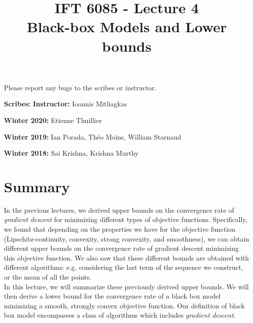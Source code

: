 \documentclass{article}
\title{IFT 6085 - Lecture 4 \\ 
Black-box Models and Lower bounds }
\date{}
\begin{document}
 

\maketitle

\vspace{-0.5in}
\begin{center}
Please report any bugs to the scribes or instructor.
\end{center}
\vspace{0.2in}

\textbf{Scribes:}
\hfill
\textbf{Instructor:} Ioannis Mitliagkas

\textbf{Winter 2020:} Etienne Thuillier

\textbf{Winter 2019:} Ian Porada, Th\'eo Moins, William Starnaud 

\textbf{Winter 2018:} Sai Krishna, Krishna Murthy 



\newcommand{\infgc}{\inf_{g \in \mathcal{C}}}
\newcommand{\supgc}{\sup_{g \in \mathcal{C}}}

\newcommand{\Prob}{\mathbb{P}}
\newcommand{\E}{\mathbb{E}}
\newcommand{\reals}{\mathbb{R}}


\section{Summary}

In the previous lectures, we derived upper bounds on the convergence rate of \emph{gradient descent} for minimizing different types of objective functions. Specifically, we found that depending on the properties we have for the objective function (Lipschitz-continuity, convexity, strong convexity, and smoothness), we can obtain different upper bounds on the convergence rate of gradient descent minimizing this objective function. We also saw that these different bounds are obtained with different algorithms: e.g. considering the last term of the sequence we construct, or the mean of all the points. \\

In this lecture, we will summarize these previously derived upper bounds. We will then derive a lower bound for the convergence rate of a black box model minimizing a smooth, strongly convex objective function. Our definition of black box model encompasses a class of algorithms which includes \emph{gradient descent}. \\
\end{document}
